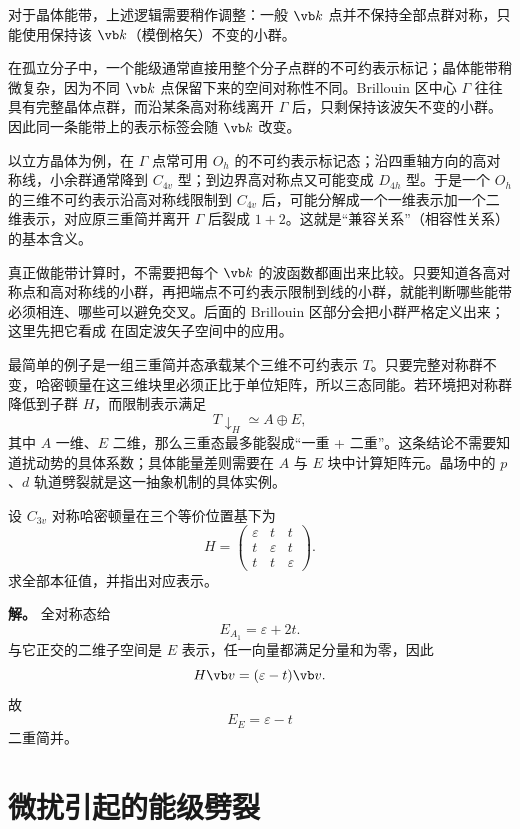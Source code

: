 对于晶体能带，上述逻辑需要稍作调整：一般 $\vb k$ 点并不保持全部点群对称，只能使用保持该 $\vb k$（模倒格矢）不变的小群。

在孤立分子中，一个能级通常直接用整个分子点群的不可约表示标记；晶体能带稍微复杂，因为不同 $\vb k$ 点保留下来的空间对称性不同。Brillouin 区中心 $\Gamma$ 往往具有完整晶体点群，而沿某条高对称线离开 $\Gamma$ 后，只剩保持该波矢不变的小群。因此同一条能带上的表示标签会随 $\vb k$ 改变。

以立方晶体为例，在 $\Gamma$ 点常可用 $O_h$ 的不可约表示标记态；沿四重轴方向的高对称线，小余群通常降到 $C_{4v}$ 型；到边界高对称点又可能变成 $D_{4h}$ 型。于是一个 $O_h$ 的三维不可约表示沿高对称线限制到 $C_{4v}$ 后，可能分解成一个一维表示加一个二维表示，对应原三重简并离开 $\Gamma$ 后裂成 $1+2$。这就是“兼容关系”（相容性关系）的基本含义。

真正做能带计算时，不需要把每个 $\vb k$ 的波函数都画出来比较。只要知道各高对称点和高对称线的小群，再把端点不可约表示限制到线的小群，就能判断哪些能带必须相连、哪些可以避免交叉。后面的 Brillouin 区部分会把小群严格定义出来；这里先把它看成  在固定波矢子空间中的应用。

最简单的例子是一组三重简并态承载某个三维不可约表示 $T$。只要完整对称群不变，哈密顿量在这三维块里必须正比于单位矩阵，所以三态同能。若环境把对称群降低到子群 $H$，而限制表示满足
\[
T\downarrow_H\simeq A\oplus E,
\]
其中 $A$ 一维、$E$ 二维，那么三重态最多能裂成“一重 + 二重”。这条结论不需要知道扰动势的具体系数；具体能量差则需要在 $A$ 与 $E$ 块中计算矩阵元。晶场中的 $p$、$d$ 轨道劈裂就是这一抽象机制的具体实例。

\begin{workedexample}
设 $C_{3v}$ 对称哈密顿量在三个等价位置基下为
\[
H=\begin{pmatrix}\varepsilon&t&t\\t&\varepsilon&t\\t&t&\varepsilon\end{pmatrix}.
\]
求全部本征值，并指出对应表示。

\textbf{解。} 全对称态给
\[
E_{A_1}=\varepsilon+2t.
\]
与它正交的二维子空间是 $E$ 表示，任一向量都满足分量和为零，因此
\[
H\vb v=(\varepsilon-t)\vb v.
\]
故
\[
E_E=\varepsilon-t
\]
二重简并。
\end{workedexample}

\section{微扰引起的能级劈裂}
\label{sec:perturbative-splitting}


